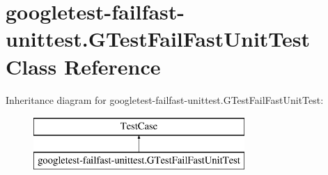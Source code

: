 \hypertarget{classgoogletest-failfast-unittest_1_1GTestFailFastUnitTest}{}\section{googletest-\/failfast-\/unittest.G\+Test\+Fail\+Fast\+Unit\+Test Class Reference}
\label{classgoogletest-failfast-unittest_1_1GTestFailFastUnitTest}
Inheritance diagram for googletest-\/failfast-\/unittest.G\+Test\+Fail\+Fast\+Unit\+Test\+:\begin{figure}[H]
\begin{center}
\leavevmode
\includegraphics[height=2.000000cm]{classgoogletest-failfast-unittest_1_1GTestFailFastUnitTest}
\end{center}
\end{figure}

